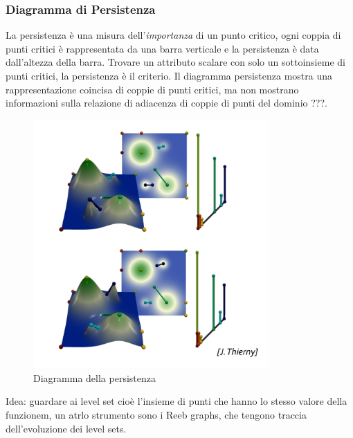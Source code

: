 \subsubsection{Diagramma di Persistenza}
La persistenza è una misura dell'\textit{importanza} di un punto critico, ogni coppia di punti critici è rappresentata da una barra verticale e la persistenza è data dall'altezza della barra.
Trovare un attributo scalare con solo un sottoinsieme di punti critici, la persistenza è il criterio.
Il diagramma persistenza mostra una rappresentazione coincisa di coppie di punti critici, ma non mostrano informazioni sulla relazione di adiacenza di coppie di punti del dominio ???.
\begin{figure}[H]
    \centering
    \includegraphics[width=0.8\textwidth]{images/DiagPers.png} 
    \caption{Diagramma della persistenza}
    \label{fig:immagine}
\end{figure}
Idea: guardare ai level set cioè l'insieme di punti che hanno lo stesso valore della funzionem, un atrlo strumento sono i Reeb graphs, che tengono traccia dell'evoluzione dei level sets.

